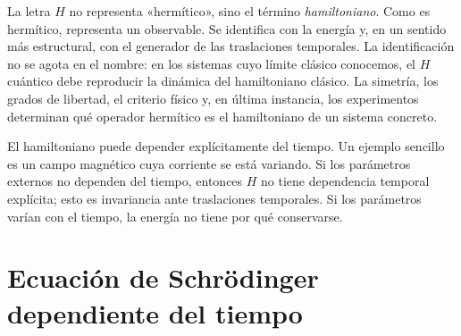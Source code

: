 La letra \(H\) no representa «hermítico», sino el término \emph{hamiltoniano}. Como es hermítico, representa un observable. Se identifica con la energía y, en un sentido más estructural, con el generador de las traslaciones temporales. La identificación no se agota en el nombre: en los sistemas cuyo límite clásico conocemos, el \(H\) cuántico debe reproducir la dinámica del hamiltoniano clásico. La simetría, los grados de libertad, el criterio físico y, en última instancia, los experimentos determinan qué operador hermítico es el hamiltoniano de un sistema concreto.

\begin{classroomqa}
\end{classroomqa}

El hamiltoniano puede depender explícitamente del tiempo. Un ejemplo sencillo es un campo magnético cuya corriente se está variando. Si los parámetros externos no dependen del tiempo, entonces \(H\) no tiene dependencia temporal explícita; esto es invariancia ante traslaciones temporales. Si los parámetros varían con el tiempo, la energía no tiene por qué conservarse.

\begin{classroomqa}
\end{classroomqa}

\section{Ecuación de Schr\"odinger dependiente del tiempo}

